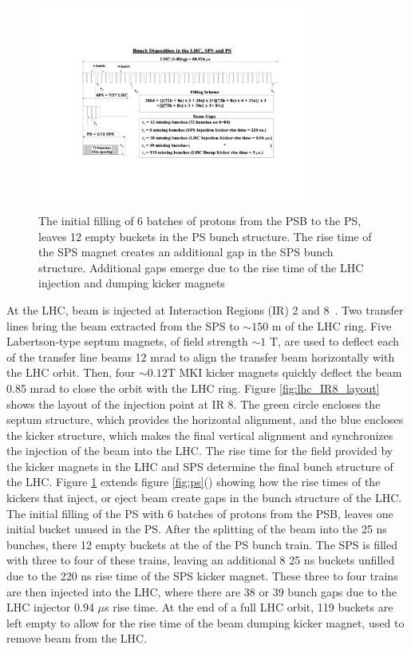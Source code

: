 \begin{figure}[h]
   \centering
  \includegraphics[width=0.8\textwidth]{Figures/LHC_Diagrams/LHC_bunchStructure.pdf}
  \caption{The initial filling of 6 batches of protons from the PSB to
  the PS, leaves 12 empty buckets in the PS bunch structure.  The rise
time of the SPS magnet creates an additional gap in the SPS bunch
structure.  Additional gaps emerge due to the rise time of the LHC
injection and dumping kicker magnets \cite{lhc:machine_description}} \label{fig:lhc_bunchStructure}
\end{figure}

\par At the LHC, beam is injected at Interaction Regions (IR) 2 and
8~\cite{lhc:machine_description}.  Two transfer lines bring the beam
extracted from the SPS to $\sim150$ m of the LHC ring.  Five
Labertson-type septum magnets, of field strength $\sim1$ T, are used
to deflect each of the transfer line beams 12 mrad to align the
transfer beam horizontally with the LHC orbit.  Then, four $\sim0.12$T
MKI kicker magnets quickly deflect the beam 0.85 mrad to close the
orbit with the LHC ring.  Figure \ref{fig:lhc_IR8_layout} shows the
layout of the injection point at IR 8.  The green circle encloses the
septum structure, which provides the horizontal alignment, and the
blue encloses the kicker structure, which makes the final vertical
alignment and synchronizes the injection of the beam into the LHC.
The rise time for the field provided by the kicker magnets in the LHC
and SPS determine the final bunch structure of the LHC.  Figure
\ref{fig:lhc_bunchStructure} extends figure
\ref{fig:ps}() showing how the rise times of
the kickers that inject, or eject beam create gaps in the bunch
structure of the LHC.  The initial filling of the PS with 6 batches of
protons from the PSB, leaves one initial bucket unused in the PS.
After the splitting of the beam into the 25 ns bunches, there 12 empty
buckets at the of the PS bunch train.  The SPS is filled with three to
four of these trains, leaving an additional 8 25 ns buckets unfilled
due to the 220 ns rise time of the SPS kicker magnet. These three to
four trains are then injected into the LHC, where there are 38 or 39
bunch gaps due to the LHC injector 0.94 $\mu$s rise time.  At the end
of a full LHC orbit, 119 buckets are left empty to allow for the rise
time of the beam dumping kicker magnet, used to remove beam from the
LHC.     

